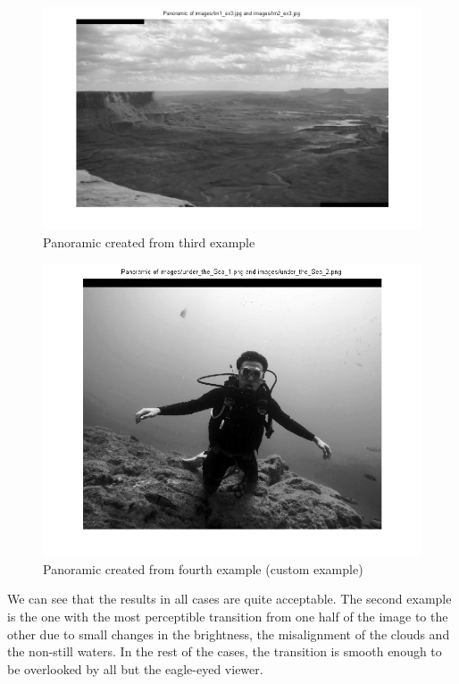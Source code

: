 \begin{figure}[htb]
	\centering
		\includegraphics[width=\textwidth]{./img/ex2/panoramic3.png}
	\caption{Panoramic created from third example}
	\label{fig:panoramic3}
\end{figure}

\begin{figure}[htb]
	\centering
		\includegraphics[width=\textwidth]{./img/ex2/panoramic4.png}
	\caption{Panoramic created from fourth example (custom example)}
	\label{fig:panoramic4}
\end{figure}

We can see that the results in all cases are quite acceptable. The second
example is the one with the most perceptible transition from one half
of the image to the other due to small changes in the brightness, the
misalignment of the clouds and the non-still waters. In the rest of
the cases, the transition is smooth enough to be overlooked by all but
the eagle-eyed viewer.